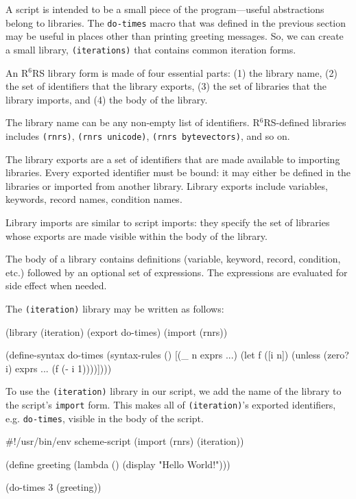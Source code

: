\documentclass[onecolumn, 12pt, twoside, openright, dvipdfm]{book}
\newcommand{\rnrs}[1]{R$^{\mathrm{#1}}$RS}
\begin{document}
A script is intended to be a small piece of the program---useful
abstractions belong to libraries.  The \texttt{do-times} macro that
was defined in the previous section may be useful in places other
than printing greeting messages.  So, we can create a small library,
\texttt{(iterations)} that contains common iteration forms.  

An \rnrs{6} library form is made of four essential parts: (1) the
library name, (2) the set of identifiers that the library exports,
(3) the set of libraries that the library imports, and (4) the body
of the library.  


The library name can be any non-empty list of identifiers.
\rnrs{6}-defined libraries includes \texttt{(rnrs)},
\texttt{(rnrs~unicode)}, \texttt{(rnrs~bytevectors)}, and so on.

The library exports are a set of identifiers that are made available
to importing libraries.  Every exported identifier must be bound: it
may either be defined in the libraries or imported from another
library.  Library exports include variables, keywords, record names,
condition names.

Library imports are similar to script imports: they specify the set
of libraries whose exports are made visible within the body of the
library.  

The body of a library contains definitions (variable, keyword,
record, condition, etc.) followed by an optional set of expressions.
The expressions are evaluated for side effect when needed.


The \texttt{(iteration)} library may be written as follows:

\begin{CodeInline}
(library (iteration)
  (export do-times)
  (import (rnrs))

  (define-syntax do-times
    (syntax-rules ()
      [(_ n exprs ...)
       (let f ([i n])
         (unless (zero? i)
           exprs ...
           (f (- i 1))))])))
\end{CodeInline}

To use the \texttt{(iteration)} library in our script, we add the
name of the library to the script's \texttt{import} form.  This
makes all of \texttt{(iteration)}'s exported identifiers, e.g.
\texttt{do-times},  visible in the body of the script.

\begin{CodeInline}
#!/usr/bin/env scheme-script
(import (rnrs) (iteration))

(define greeting
  (lambda ()
    (display "Hello World!\n")))

(do-times 3 (greeting))
\end{CodeInline}
\end{document}

